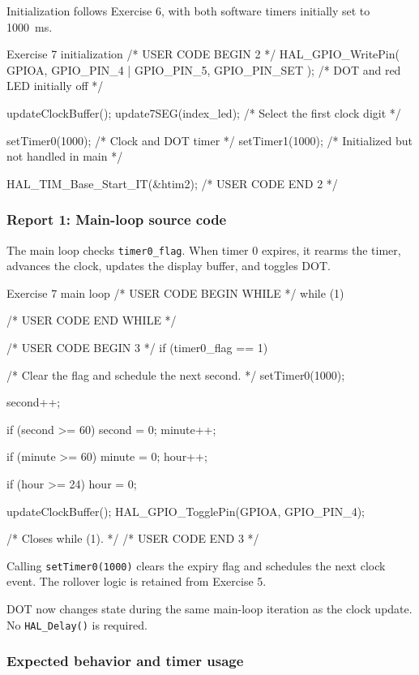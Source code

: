 \documentclass[a4paper]{article}
\begin{document}
Initialization follows Exercise 6, with both
software timers initially set to 1000~ms.

\begin{stmcode}{Exercise 7 initialization}
/* USER CODE BEGIN 2 */
HAL_GPIO_WritePin(
    GPIOA, GPIO_PIN_4 | GPIO_PIN_5, GPIO_PIN_SET
);                          /* DOT and red LED initially off */

updateClockBuffer();
update7SEG(index_led);       /* Select the first clock digit */

setTimer0(1000);             /* Clock and DOT timer */
setTimer1(1000);             /* Initialized but not handled in main */

HAL_TIM_Base_Start_IT(&htim2);
/* USER CODE END 2 */
\end{stmcode}

\subsubsection{Report 1: Main-loop source code}

The main loop checks \texttt{timer0\_flag}.
When timer 0 expires, it rearms the timer,
advances the clock, updates the display buffer,
and toggles DOT.

\begin{stmcode}{Exercise 7 main loop}
/* USER CODE BEGIN WHILE */
while (1) {
    /* USER CODE END WHILE */

    /* USER CODE BEGIN 3 */
    if (timer0_flag == 1) {
      /* Clear the flag and schedule the next second. */
      setTimer0(1000);

      second++;

      if (second >= 60) {
        second = 0;
        minute++;
      }

      if (minute >= 60) {
        minute = 0;
        hour++;
      }

      if (hour >= 24) {
        hour = 0;
      }

      updateClockBuffer();
      HAL_GPIO_TogglePin(GPIOA, GPIO_PIN_4);
    }
  } /* Closes while (1). */
/* USER CODE END 3 */
\end{stmcode}

Calling \texttt{setTimer0(1000)} clears the
expiry flag and schedules the next clock event.
The rollover logic is retained from Exercise 5.

DOT now changes state during the same
main-loop iteration as the clock update.
No \texttt{HAL\_Delay()} is required.

\subsubsection{Expected behavior and timer usage}
\end{document}
